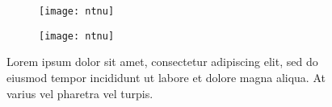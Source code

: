 \begin{figure}[h!]
\centering
	\begin{subfigure}{0.4\linewidth}
		\centering
		\texttt{[image: ntnu]}
	\end{subfigure}\quad
	\begin{subfigure}{0.4\linewidth}
		\centering
		\texttt{[image: ntnu]}
	\end{subfigure}
\caption{Lorem ipsum dolor sit amet, consectetur adipiscing elit, sed do eiusmod tempor incididunt ut labore et dolore magna aliqua. At varius vel pharetra vel turpis.}
\label{icehole1}
\end{figure}
